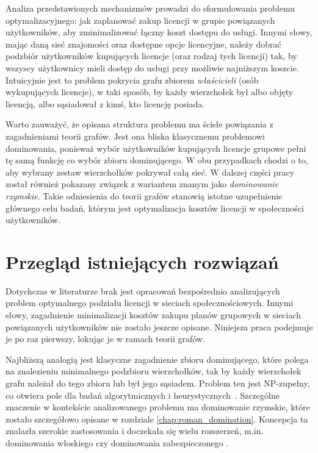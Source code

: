 Analiza przedstawionych mechanizmów prowadzi do sformułowania problemu optymalizacyjnego: jak zaplanować zakup licencji w grupie powiązanych użytkowników, aby zminimalizować łączny koszt dostępu do usługi. Innymi słowy, mając daną sieć znajomości oraz dostępne opcje licencyjne, należy dobrać podzbiór użytkowników kupujących licencje (oraz rodzaj tych licencji) tak, by wszyscy użytkownicy mieli dostęp do usługi przy możliwie najniższym koszcie. Intuicyjnie jest to problem pokrycia grafu zbiorem \emph{właścicieli} (osób wykupujących licencje), w taki sposób, by każdy wierzchołek był albo objęty licencją, albo sąsiadował z kimś, kto licencję posiada.

Warto zauważyć, że opisana struktura problemu ma ścisłe powiązania z zagadnieniami teorii grafów. Jest ona bliska klasycznemu problemowi dominowania, ponieważ wybór użytkowników kupujących licencje grupowe pełni tę samą funkcję co wybór zbioru dominującego. W obu przypadkach chodzi o to, aby wybrany zestaw wierzchołków pokrywał całą sieć. W dalszej części pracy został również pokazany związek z wariantem znanym jako \emph{dominowanie rzymskie}. Takie odniesienia do teorii grafów stanowią istotne uzupełnienie głównego celu badań, którym jest optymalizacja kosztów licencji w społeczności użytkowników.

\section{Przegląd istniejących rozwiązań}

Dotychczas w literaturze brak jest opracowań bezpośrednio analizujących problem optymalnego podziału licencji w sieciach społecznościowych. Innymi słowy, zagadnienie minimalizacji kosztów zakupu planów grupowych w sieciach powiązanych użytkowników nie zostało jeszcze opisane. Niniejsza praca podejmuje je po raz pierwszy, lokując je w ramach teorii grafów.

Najbliższą analogią jest klasyczne zagadnienie zbioru dominującego, które polega na znalezieniu minimalnego podzbioru wierzchołków, tak by każdy wierzchołek grafu należał do tego zbioru lub był jego sąsiadem. Problem ten jest NP-zupełny, co otwiera pole dla badań algorytmicznych i heurystycznych~\cite{garey1979}. Szczególne znaczenie w kontekście analizowanego problemu ma dominowanie rzymskie, które zostało szczegółowo opisane w rozdziale \ref{chap:roman_domination}. Koncepcja ta znalazła szerokie zastosowania i doczekała się wielu rozszerzeń, m.in. dominowania włoskiego czy dominowania zabezpieczonego \cite{Roman2DominationSurvey}.

